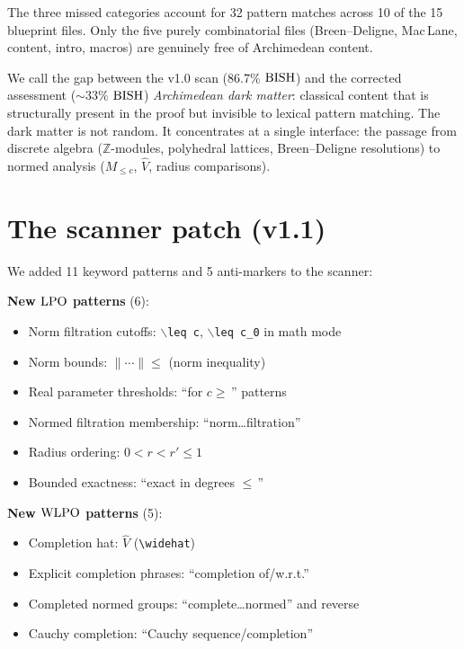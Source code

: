 \documentclass[11pt,a4paper]{article}
\theoremstyle{plain}
\theoremstyle{definition}
\newcommand{\BISH}{\textup{BISH}}
\newcommand{\WLPO}{\textup{WLPO}}
\newcommand{\LPO}{\textup{LPO}}
\newcommand{\Z}{\mathbb{Z}}
\begin{document}
The three missed categories account for 32 pattern matches across
10 of the 15 blueprint files.  Only the five purely combinatorial
files (Breen--Deligne, Mac\,Lane, content, intro, macros) are genuinely
free of Archimedean content.

We call the gap between the v1.0 scan (86.7\% $\BISH$) and the
corrected assessment (${\sim}33\%$ $\BISH$) \emph{Archimedean dark
matter}: classical content that is structurally present in the proof
but invisible to lexical pattern matching.  The dark matter is not
random.  It concentrates at a single interface: the passage from
discrete algebra ($\Z$-modules, polyhedral lattices, Breen--Deligne
resolutions) to normed analysis ($M_{\leq c}$, $\widehat{V}$,
radius comparisons).

\section{The scanner patch (v1.1)}\label{sec:patch}

We added 11 keyword patterns and 5 anti-markers to the scanner:

\medskip
\noindent\textbf{New $\LPO$ patterns} (6):

\begin{itemize}[nosep]
\item Norm filtration cutoffs: $\backslash$\texttt{leq c},
  $\backslash$\texttt{leq c\_0} in math mode
\item Norm bounds: $\|{\cdots}\| \leq$ (norm inequality)
\item Real parameter thresholds: ``for $c \geq$\,'' patterns
\item Normed filtration membership: ``norm\dots filtration''
\item Radius ordering: $0 < r < r' \leq 1$
\item Bounded exactness: ``exact in degrees $\leq$\,''
\end{itemize}

\noindent\textbf{New $\WLPO$ patterns} (5):

\begin{itemize}[nosep]
\item Completion hat: $\widehat{V}$ (\texttt{\textbackslash widehat})
\item Explicit completion phrases: ``completion of/w.r.t.''
\item Completed normed groups: ``complete\dots normed'' and reverse
\item Cauchy completion: ``Cauchy sequence/completion''
\end{itemize}
\end{document}
